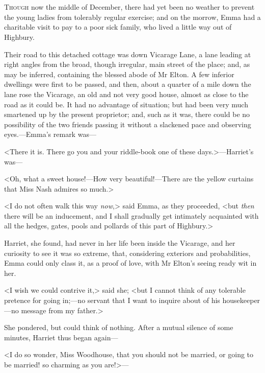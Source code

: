 \chapter[Chapter \thechapter]{}
\lettrine[lraise=0.3]{T}{hough} now the middle of December, there had yet been no weather to prevent the young ladies from tolerably regular exercise; and on the morrow, Emma had a charitable visit to pay to a poor sick family, who lived a little way out of Highbury.

Their road to this detached cottage was down Vicarage Lane, a lane leading at right angles from the broad, though irregular, main street of the place; and, as may be inferred, containing the blessed abode of Mr Elton. A few inferior dwellings were first to be passed, and then, about a quarter of a mile down the lane rose the Vicarage, an old and not very good house, almost as close to the road as it could be. It had no advantage of situation; but had been very much smartened up by the present proprietor; and, such as it was, there could be no possibility of the two friends passing it without a slackened pace and observing eyes.—Emma's remark was—

<There it is. There go you and your riddle-book one of these days.>—Harriet's was—

<Oh, what a sweet house!—How very beautiful!—There are the yellow curtains that Miss Nash admires so much.>

<I do not often walk this way \textit{now},> said Emma, as they proceeded, <but \textit{then} there will be an inducement, and I shall gradually get intimately acquainted with all the hedges, gates, pools and pollards of this part of Highbury.>

Harriet, she found, had never in her life been inside the Vicarage, and her curiosity to see it was so extreme, that, considering exteriors and probabilities, Emma could only class it, as a proof of love, with Mr Elton's seeing ready wit in her.

<I wish we could contrive it,> said she; <but I cannot think of any tolerable pretence for going in;—no servant that I want to inquire about of his housekeeper—no message from my father.>

She pondered, but could think of nothing. After a mutual silence of some minutes, Harriet thus began again—

<I do so wonder, Miss Woodhouse, that you should not be married, or going to be married! so charming as you are!>—

